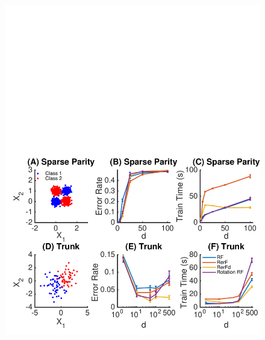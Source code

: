 \documentclass{article} %
\begin{document}
\begin{figure}[h]
\begin{center}
\includegraphics[trim=0in 0in 0in 0in, clip=true, width=\linewidth]{../Figures/pdf/Fig2_simulations}
\end{center}
\caption{}
\label{fig:sim}
\end{figure}
\end{document}
